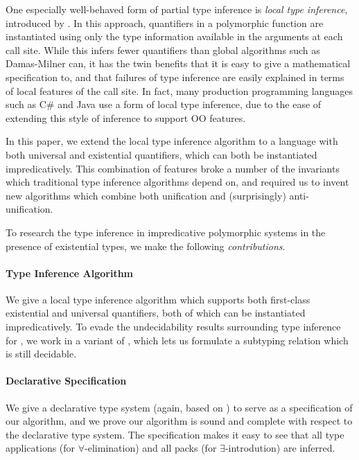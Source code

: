 One especially well-behaved form of partial type inference is \emph{local type
inference}, introduced by \citet{pierce2000:local}. In this approach,
quantifiers in a polymorphic function are instantiated using only the type
information available in the arguments at each call site. While this infers
fewer quantifiers than global algorithms such as Damas-Milner can, it has the
twin benefits that it is easy to give a mathematical specification to, and that
failures of type inference are easily explained in terms of local features of
the call site. In fact, many production programming languages such as C\# and
Java use a form of local type inference, due to the ease of extending this style
of inference to support OO features. 

In this paper, we extend the local type inference algorithm to a language with
both universal and existential quantifiers, which can both be instantiated
impredicatively. This combination of features broke a number of the invariants
which traditional type inference algorithms depend on, and required us to invent
new algorithms which combine both unification and (surprisingly)
anti-unification. 

To research the type inference in impredicative polymorphic systems
in the presence of existential types, we make the following \emph{contributions}.

\paragraph{Type Inference Algorithm} We give a local type inference algorithm
    which supports both first-class existential and universal quantifiers, both
    of which can be instantiated impredicatively. To evade the undecidability
    results surrounding type inference for \systemf, we work in a variant of
    \CBPV \cite{levy2006:cbpv}, which lets us formulate a subtyping relation
    which is still decidable. 

\paragraph{Declarative Specification}
    We give a declarative type system (again, based on \CBPV) to
    serve as a specification of our algorithm, and we prove our algorithm is
    sound and complete with respect to the declarative type system. The
    specification makes it easy to see that all type applications (for
    $\forall$-elimination) and all packs (for $\exists$-introdution) are
    inferred. 


